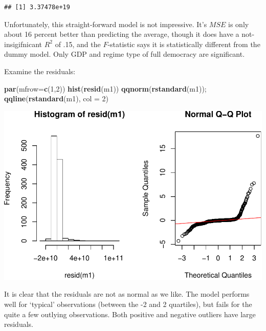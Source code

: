 \documentclass[11pt,]{article}
\newenvironment{Shaded}{\begin{snugshade}}{\end{snugshade}}
\newcommand{\DataTypeTok}[1]{\textcolor[rgb]{0.13,0.29,0.53}{#1}}
\newcommand{\DecValTok}[1]{\textcolor[rgb]{0.00,0.00,0.81}{#1}}
\newcommand{\KeywordTok}[1]{\textcolor[rgb]{0.13,0.29,0.53}{\textbf{#1}}}
\newcommand{\NormalTok}[1]{#1}
\begin{document}
\begin{verbatim}
## [1] 3.37478e+19
\end{verbatim}

Unfortunately, this straight-forward model is not impressive. It's
\(MSE\) is only about 16 percent better than predicting the average,
though it does have a not-insigifnicant \(R^2\) of .15, and the
\(F\)-statistic says it is statistically different from the dummy model.
Only GDP and regime type of full democracy are significant.

Examine the residuals:

\begin{Shaded}
\begin{Highlighting}[]
\KeywordTok{par}\NormalTok{(}\DataTypeTok{mfrow=}\KeywordTok{c}\NormalTok{(}\DecValTok{1}\NormalTok{,}\DecValTok{2}\NormalTok{))}
\KeywordTok{hist}\NormalTok{(}\KeywordTok{resid}\NormalTok{(m1))}
\KeywordTok{qqnorm}\NormalTok{(}\KeywordTok{rstandard}\NormalTok{(m1)); }\KeywordTok{qqline}\NormalTok{(}\KeywordTok{rstandard}\NormalTok{(m1), }\DataTypeTok{col =} \DecValTok{2}\NormalTok{)}
\end{Highlighting}
\end{Shaded}

\includegraphics{report_files/figure-latex/unnamed-chunk-18-1.pdf}

It is clear that the residuals are not as normal as we like. The model
performs well for `typical' observations (between the -2 and 2
quartiles), but fails for the quite a few outlying observations. Both
positive and negative outliers have large residuals.
\end{document}
